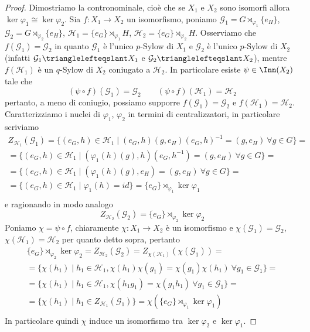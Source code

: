 \documentclass[11pt]{scrartcl}
\begin{document}
	\begin{proof}
		Dimostriamo la contronominale, cioè che se $X_1$ e $X_2$ sono isomorfi
		allora $\ker\varphi_1 \cong \ker\varphi_2$.\newline
		Sia $f: X_1\longrightarrow X_2$ un isomorfismo, poniamo $\mathcal{G}_1 = 
		G\rtimes_{\varphi_1}\{e_H\}$, $\mathcal{G}_2 = G\rtimes_{\varphi_2}\{e_H\}$,
		$\mathcal{H}_1 = \{e_G\}\rtimes_{\varphi_1}H$, $\mathcal{H}_2 = \{e_G\}\rtimes_{\varphi_2}H$.
		Osserviamo che $f(\mathcal{G}_1) = \mathcal{G}_2$ in quanto $\mathcal{G}_1$
		è l'unico $p$-Sylow di $X_1$ e $\mathcal{G}_2$ è l'unico $p$-Sylow di $X_2$
		(infatti $\mathcal{G}_1 \trianglelefteqslant X_1$ e $\mathcal{G}_2 
		\trianglelefteqslant X_2$), mentre $f(\mathcal{H}_1)$ è un $q$-Sylow di $X_2$
		coniugato a $\mathcal{H}_2$. In particolare esiste $\psi \in \Inn(X_2)$
		tale che
		\[
		(\psi\circ f)(\mathcal{G}_1) = \mathcal{G}_2 \qquad 
		(\psi\circ f)(\mathcal{H}_1) = \mathcal{H}_2
		\]
		pertanto, a meno di coniugio, possiamo supporre $f(\mathcal{G}_1) = \mathcal{G}_2$ e 
		$f(\mathcal{H}_1) = \mathcal{H}_2$. Caratterizziamo i nuclei di $\varphi_1$, 
		$\varphi_2$ in termini di centralizzatori, in particolare scriviamo
		\begin{multline*}
			Z_{\mathcal{H}_1}(\mathcal{G}_1) = \{(e_G, h) \in \mathcal{H}_1\mid
			(e_G, h)(g, e_H)(e_G, h)^{-1} = (g, e_H)~\forall g \in G\} = \\
			= \{(e_G, h)\in \mathcal{H}_1 \mid (\varphi_1(h)(g), h)(e_G, h^{-1})
			= (g, e_H)~\forall g \in G\} = \\
			= \{(e_G, h) \in \mathcal{H}_1\mid (\varphi_1(h)(g), e_H) = (g, e_H)~
			\forall g \in G\} = \\
			= \{(e_G, h) \in \mathcal{H}_1\mid \varphi_1(h) = id\} =
			\{e_G\}\rtimes_{\varphi_1}\ker\varphi_1\\
		\end{multline*}
		e ragionando in modo analogo
		\[
		Z_{\mathcal{H}_2}(\mathcal{G}_2) = \{e_G\}\rtimes_{\varphi_2}\ker\varphi_2
		\]
		Poniamo $\chi = \psi\circ f$, chiaramente $\chi: X_1\longrightarrow X_2$
		è un isomorfismo e $\chi(\mathcal{G}_1) = \mathcal{G}_2$, $\chi(\mathcal{H}_1)
		= \mathcal{H}_2$ per quanto detto sopra, pertanto
		\begin{multline*}
			\{e_G\}\rtimes_{\varphi_2}\ker\varphi_2 = Z_{\mathcal{H}_2}(\mathcal{G}_2) =
			Z_{\chi(\mathcal{H}_1)}(\chi(\mathcal{G}_1)) = \\
			= \{\chi(h_1) \mid h_1 \in \mathcal{H}_1, \chi(h_1)\chi(g_1) = 
			\chi(g_1)\chi(h_1)~\forall g_1 \in \mathcal{G}_1\} = \\
			= \{\chi(h_1)\mid h_1 \in \mathcal{H}_1, \chi(h_1g_1) = \chi(g_1h_1)
			~\forall g_1 \in \mathcal{G}_1\} = \\
			= \{\chi(h_1) \mid h_1 \in Z_{\mathcal{H}_1}(\mathcal{G}_1)\} = 
			\chi(\{e_G\}\rtimes_{\varphi_1}\ker\varphi_1)\\
		\end{multline*}
		In particolare quindi $\chi$ induce un isomorfismo tra $\ker\varphi_2$ e 
		$\ker\varphi_1$.
	\end{proof}
	
\end{document}
